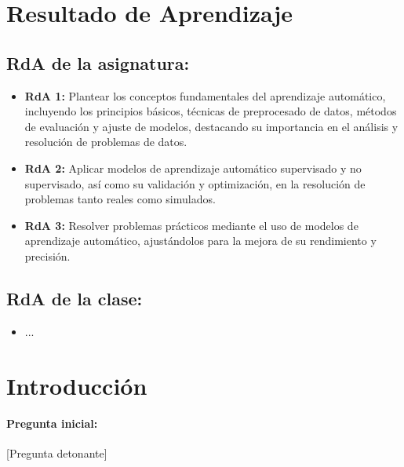 \documentclass[a4,11pt]{aleph-notas}
\begin{document}
\encabezado

\section*{Resultado de Aprendizaje}

\subsection*{RdA de la asignatura:}
\begin{itemize}[leftmargin=*]
    \item \textbf{RdA 1:} Plantear los conceptos fundamentales del aprendizaje automático, incluyendo los principios básicos, técnicas de preprocesado de datos, métodos de evaluación y ajuste de modelos, destacando su importancia en el análisis y resolución de problemas de datos.
    \item \textbf{RdA 2:} Aplicar modelos de aprendizaje automático supervisado y no supervisado, así como su validación y optimización, en la resolución de problemas tanto reales como simulados.
    \item \textbf{RdA 3:} Resolver problemas prácticos mediante el uso de modelos de aprendizaje automático, ajustándolos para la mejora de su rendimiento y precisión.
\end{itemize}

\subsection*{RdA de la clase:}
\begin{itemize}[leftmargin=*]
    \item ...
\end{itemize}

\section*{Introducción}

\paragraph{Pregunta inicial:} 
[Pregunta detonante]
\end{document}
